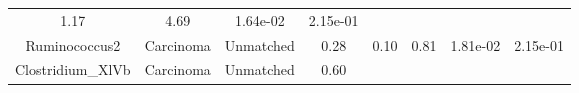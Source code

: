 \documentclass[12pt,]{article}
\begin{document}
\begin{longtable}[]{@{}cccccccc@{}}
\begin{minipage}[t]{0.13\columnwidth}
1.17\strut
\end{minipage} & \begin{minipage}[t]{0.13\columnwidth}\centering\strut
4.69\strut
\end{minipage} & \begin{minipage}[t]{0.07\columnwidth}\centering\strut
1.64e-02\strut
\end{minipage} & \begin{minipage}[t]{0.07\columnwidth}\centering\strut
2.15e-01\strut
\end{minipage}\tabularnewline
\begin{minipage}[t]{0.16\columnwidth}\centering\strut
Ruminococcus2\strut
\end{minipage} & \begin{minipage}[t]{0.08\columnwidth}\centering\strut
Carcinoma\strut
\end{minipage} & \begin{minipage}[t]{0.09\columnwidth}\centering\strut
Unmatched\strut
\end{minipage} & \begin{minipage}[t]{0.05\columnwidth}\centering\strut
0.28\strut
\end{minipage} & \begin{minipage}[t]{0.13\columnwidth}\centering\strut
0.10\strut
\end{minipage} & \begin{minipage}[t]{0.13\columnwidth}\centering\strut
0.81\strut
\end{minipage} & \begin{minipage}[t]{0.07\columnwidth}\centering\strut
1.81e-02\strut
\end{minipage} & \begin{minipage}[t]{0.07\columnwidth}\centering\strut
2.15e-01\strut
\end{minipage}\tabularnewline
\begin{minipage}[t]{0.16\columnwidth}\centering\strut
Clostridium\_XlVb\strut
\end{minipage} & \begin{minipage}[t]{0.08\columnwidth}\centering\strut
Carcinoma\strut
\end{minipage} & \begin{minipage}[t]{0.09\columnwidth}\centering\strut
Unmatched\strut
\end{minipage} & \begin{minipage}[t]{0.05\columnwidth}\centering\strut
0.60\strut
\end{minipage} & \begin{minipage}[t]{0.13\columnwidth}\centering\strut

\end{minipage}
\end{longtable}
\end{document}
